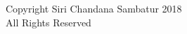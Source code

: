 \vspace*{5cm}
\begin{center}
    Copyright \textcopyright Siri Chandana Sambatur 2018\\
    All Rights Reserved\\
\end{center}
\setcounter{page}{3}
\thispagestyle{empty}

\clearpage

